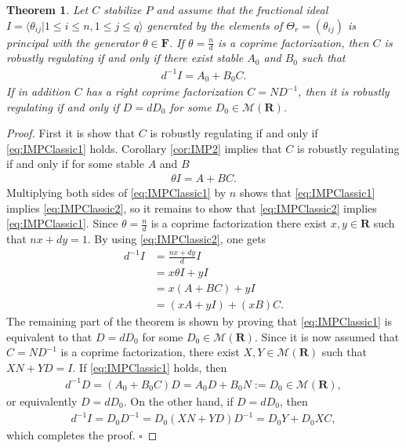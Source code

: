 \documentclass[11pt, a4paper]{amsart}
\newcommand{\inv}{^{-1}}
\newtheorem{theorem}{Theorem}[section]
\newcommand{\matrices}[1]{\mathcal{M}\left( #1 \right)}		%
\newcommand{\Plant}{P}										%
\newcommand{\Cont}{C}										%
\newcommand{\Gen}{\Theta}									%
\newcommand{\gen}{\theta}									%
\newcommand{\stable}{\mathbf{R}}							%
\newcommand{\fractions}[1]{\mathbf{F}} %
\begin{document}
\begin{theorem}\label{thm:IMPClassic}
Let $\Cont$ stabilize $\Plant$ and assume that the fractional ideal $I=\langle \gen_{ij} | 1\leq i\leq n, 1\leq j\leq q\rangle$ generated by the elements of $\Gen_r=(\gen_{ij})$ is principal with the generator $\gen\in\fractions{\stable}$. If $\gen=\frac{n}{d}$ is a coprime factorization, then $\Cont$ is robustly regulating if and only if
there exist stable $A_0$ and $B_0$ such that
\begin{align}\label{eq:IMPClassic1}
d\inv I=A_0+B_0\Cont.
\end{align}
If in addition $\Cont$ has a right coprime factorization $\Cont=N D^{-1}$,
then it is robustly regulating if and only if $D=d D_0$ for some $D_0\in\matrices{\stable}$.
\end{theorem}
\begin{proof}
First it is show that $\Cont$ is robustly regulating if and only if \eqref{eq:IMPClassic1} holds. Corollary \ref{cor:IMP2} implies that $\Cont$ is robustly regulating if and only if for some stable $A$ and $B$
\begin{align}\label{eq:IMPClassic2}
\gen I=A+B\Cont.
\end{align}
Multiplying both sides of \eqref{eq:IMPClassic1} by $n$ shows that \eqref{eq:IMPClassic1} implies \eqref{eq:IMPClassic2}, so it remains to show that \eqref{eq:IMPClassic2} implies \eqref{eq:IMPClassic1}. Since $\gen=\frac{n}{d}$ is a coprime factorization there exist $x,y\in\stable$ such that $nx+dy=1$. By using \eqref{eq:IMPClassic2}, one gets
\begin{align*}
d\inv I & =\frac{nx+dy}{d}I \\
& =x\gen I+ yI\\
& =x(A+B\Cont)+yI\\
&=(xA+yI)+(xB)\Cont.
\end{align*}
The remaining part of the theorem is shown by proving that \eqref{eq:IMPClassic1} is equivalent to that $D=dD_0$ for some $D_0\in\matrices{\stable}$. Since it is now assumed that $\Cont=N D^{-1}$ is a coprime factorization, there exist $X,Y\in\matrices{\stable}$ such that $XN+YD=I$. If \eqref{eq:IMPClassic1} holds, then
\begin{align*}
d\inv D=(A_0+B_0\Cont)D=A_0 D+B_0 N:=D_0\in\matrices{\stable},
\end{align*}
or equivalently $D=dD_0$. On the other hand, if $D=d D_0$, then
\begin{align*}
d\inv I=D_0 D\inv=D_0(XN+YD)D\inv=D_0 Y+D_0 X \Cont,
\end{align*}
which completes the proof. \hfill$\square$
\end{proof}
\end{document}
